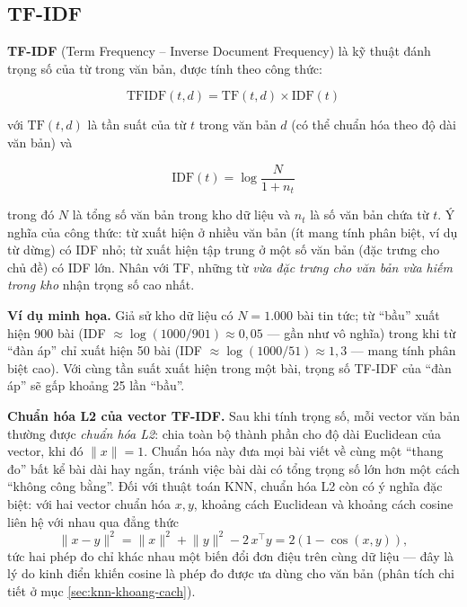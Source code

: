 \subsection{TF-IDF}
\label{sec:tfidf}

\textbf{TF-IDF} (Term Frequency -- Inverse Document Frequency) là kỹ thuật đánh trọng số của từ trong văn bản, được tính theo công thức:

\begin{equation}
    \mathrm{TFIDF}(t, d) = \mathrm{TF}(t, d) \times \mathrm{IDF}(t)
    \label{eq:tfidf}
\end{equation}

với $\mathrm{TF}(t, d)$ là tần suất của từ $t$ trong văn bản $d$ (có thể chuẩn hóa theo độ dài văn bản) và

\begin{equation}
    \mathrm{IDF}(t) = \log \frac{N}{1 + n_t}
    \label{eq:idf}
\end{equation}

trong đó $N$ là tổng số văn bản trong kho dữ liệu và $n_t$ là số văn bản chứa từ $t$. Ý nghĩa của công thức: từ xuất hiện ở nhiều văn bản (ít mang tính phân biệt, ví dụ từ dừng) có IDF nhỏ; từ xuất hiện tập trung ở một số văn bản (đặc trưng cho chủ đề) có IDF lớn. Nhân với TF, những từ \textit{vừa đặc trưng cho văn bản vừa hiếm trong kho} nhận trọng số cao nhất.

\textbf{Ví dụ minh họa.} Giả sử kho dữ liệu có $N = 1.000$ bài tin tức; từ ``bầu'' xuất hiện 900 bài (IDF $\approx \log(1000/901) \approx 0{,}05$ --- gần như vô nghĩa) trong khi từ ``đàn áp'' chỉ xuất hiện 50 bài (IDF $\approx \log(1000/51) \approx 1{,}3$ --- mang tính phân biệt cao). Với cùng tần suất xuất hiện trong một bài, trọng số TF-IDF của ``đàn áp'' sẽ gấp khoảng 25 lần ``bầu''.

\textbf{Chuẩn hóa L2 của vector TF-IDF.} Sau khi tính trọng số, mỗi vector văn bản thường được \textit{chuẩn hóa L2}: chia toàn bộ thành phần cho độ dài Euclidean của vector, khi đó $\lVert x \rVert = 1$. Chuẩn hóa này đưa mọi bài viết về cùng một ``thang đo'' bất kể bài dài hay ngắn, tránh việc bài dài có tổng trọng số lớn hơn một cách ``không công bằng''. Đối với thuật toán KNN, chuẩn hóa L2 còn có ý nghĩa đặc biệt: với hai vector chuẩn hóa $x, y$, khoảng cách Euclidean và khoảng cách cosine liên hệ với nhau qua đẳng thức
\begin{equation}
    \lVert x - y \rVert^2 = \lVert x \rVert^2 + \lVert y \rVert^2 - 2\,x^{\top}y = 2\left(1 - \cos(x, y)\right),
    \label{eq:l2-cos}
\end{equation}
tức hai phép đo chỉ khác nhau một biến đổi đơn điệu trên cùng dữ liệu --- đây là lý do kinh điển khiến cosine là phép đo được ưa dùng cho văn bản (phân tích chi tiết ở mục \ref{sec:knn-khoang-cach}).

